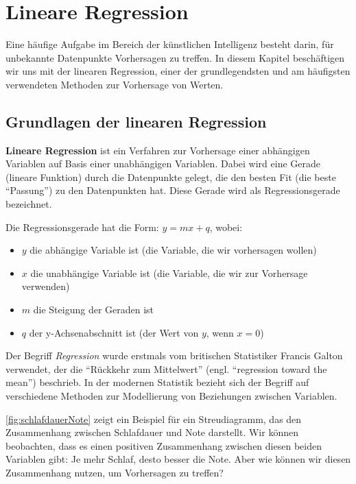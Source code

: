 \chapter{Lineare Regression}

Eine häufige Aufgabe im Bereich der künstlichen Intelligenz besteht darin, für unbekannte Datenpunkte Vorhersagen zu treffen. In diesem Kapitel beschäftigen wir uns mit der linearen Regression, einer der grundlegendsten und am häufigsten verwendeten Methoden zur Vorhersage von Werten.

\section{Grundlagen der linearen Regression}

\begin{mydefinition}
\textbf{Lineare Regression} ist ein Verfahren zur Vorhersage einer abhängigen Variablen auf Basis einer unabhängigen Variablen. Dabei wird eine Gerade (lineare Funktion) durch die Datenpunkte gelegt, die den besten Fit (die beste \enquote{Passung}) zu den Datenpunkten hat. Diese Gerade wird als Regressionsgerade bezeichnet.

Die Regressionsgerade hat die Form: $y = mx + q$, wobei:
\begin{itemize}
	\item $y$ die abhängige Variable ist (die Variable, die wir vorhersagen wollen)
	\item $x$ die unabhängige Variable ist (die Variable, die wir zur Vorhersage verwenden)
	\item $m$ die Steigung der Geraden ist
	\item $q$ der y-Achsenabschnitt ist (der Wert von $y$, wenn $x = 0$)
\end{itemize}

Der Begriff \textit{Regression} wurde erstmals vom britischen Statistiker Francis Galton verwendet, der die \enquote{Rückkehr zum Mittelwert} (engl. \enquote{regression toward the mean}) beschrieb. In der modernen Statistik bezieht sich der Begriff auf verschiedene Methoden zur Modellierung von Beziehungen zwischen Variablen.
\end{mydefinition}

\cref{fig:schlafdauerNote} zeigt ein Beispiel für ein Streudiagramm, das den Zusammenhang zwischen Schlafdauer und Note darstellt. Wir können beobachten, dass es einen positiven Zusammenhang zwischen diesen beiden Variablen gibt: Je mehr Schlaf, desto besser die Note. Aber wie können wir diesen Zusammenhang nutzen, um Vorhersagen zu treffen?

